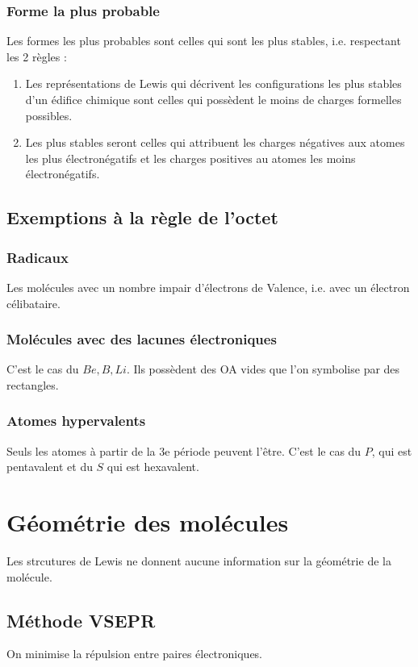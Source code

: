 \documentclass[french]{yLectureNote}
\begin{document}
\subsubsection{Forme la plus probable}
Les formes les plus probables sont celles qui sont les plus stables, i.e. respectant les 2 règles :
\begin{theorem}
\begin{enumerate}
 \item Les représentations de Lewis qui décrivent les configurations les
plus stables d’un édifice chimique sont celles qui possèdent le moins de charges formelles possibles.
\item Les plus stables seront celles qui attribuent les charges négatives aux atomes les plus électronégatifs et les charges positives au atomes les moins électronégatifs.
\end{enumerate}
\end{theorem}
\subsection{Exemptions à la règle de l'octet}
\subsubsection{Radicaux}
Les molécules avec un nombre impair d'électrons de Valence, i.e. avec un électron célibataire.
\subsubsection{Molécules avec des lacunes électroniques}
C'est le cas du $Be, B, Li$. Ils possèdent des OA vides que l'on symbolise par des rectangles.
\subsubsection{Atomes hypervalents}
Seuls les atomes à partir de la 3e période peuvent l'\^etre. C'est le cas du $P$, qui est pentavalent et du $S$ qui est hexavalent.



\section{Géométrie des molécules}
Les strcutures de Lewis ne donnent aucune information sur la géométrie de la molécule.
\subsection{Méthode VSEPR}
On minimise la répulsion entre paires électroniques.
\end{document}
